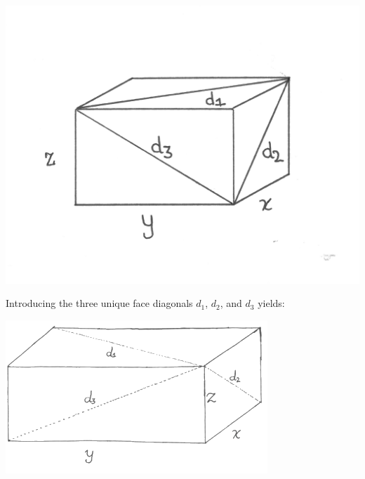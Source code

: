 \documentclass[11pt]{article}
\begin{document}
\includegraphics[scale=0.5]{1.png}

Introducing the three unique face diagonals $d_1$, $d_2$, and $d_3$ yields:

\includegraphics[scale=0.5]{2.png}
\end{document}
